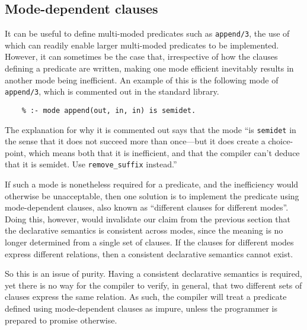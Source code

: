 \subsection{Mode-dependent clauses}
\label{sec:mode-dependent}

It can be useful to define
multi-moded predicates such as \texttt{append/3},
the use of which can readily enable
larger multi-moded predicates to be implemented.
However,
it can sometimes be the case that,
irrespective of how the clauses defining a predicate are written,
making one mode efficient inevitably results in
another mode being inefficient.
An example of this is the following mode of \texttt{append/3},
which is commented out in the standard library.
\begin{verbatim}
    % :- mode append(out, in, in) is semidet.
\end{verbatim}
The explanation for why it is commented out says that the mode
``is \texttt{semidet} in the sense that it does not
succeed more than once---but it does create a choice-point, which means
both that it is inefficient, and that the compiler can't deduce that
it is semidet. Use \texttt{remove\_suffix} instead.''

If such a mode is nonetheless required for a predicate,
and the inefficiency would otherwise be unacceptable,
then one solution is to implement the predicate
using mode-dependent clauses,
also known as ``different clauses for different modes''.
Doing this, however,
would invalidate our claim from the previous section
that the declarative semantics is consistent across modes,
since the meaning is no longer determined from a single set of clauses.
If the clauses for different modes express different relations,
then a consistent declarative semantics cannot exist.

So this is an issue of purity.
Having a consistent declarative semantics is required,
yet there is no way for the compiler to verify, in general,
that two different sets of clauses express the same relation.
As such,
the compiler will treat a predicate
defined using mode-dependent clauses as impure,
unless the programmer is prepared to promise otherwise.

